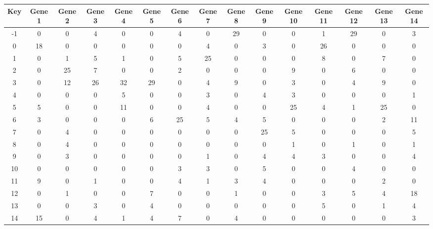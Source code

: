 \begin{tabular}{|c|c|c|c|c|c|c|c|c|c|c|c|c|c|c|}
\hline
Key & Gene 1 & Gene 2 & Gene 3 & Gene 4 & Gene 5 & Gene 6 & Gene 7 & Gene 8 & Gene 9 & Gene 10 & Gene 11 & Gene 12 & Gene 13 & Gene 14 \\
\hline
-1 & 0 & 0 & 4 & 0 & 0 & 4 & 0 & 29 & 0 & 0 & 1 & 29 & 0 & 3 \\
0 & 18 & 0 & 0 & 0 & 0 & 0 & 4 & 0 & 3 & 0 & 26 & 0 & 0 & 0 \\
1 & 0 & 1 & 5 & 1 & 0 & 5 & 25 & 0 & 0 & 0 & 8 & 0 & 7 & 0 \\
2 & 0 & 25 & 7 & 0 & 0 & 2 & 0 & 0 & 0 & 9 & 0 & 6 & 0 & 0 \\
3 & 0 & 12 & 26 & 32 & 29 & 0 & 4 & 9 & 0 & 3 & 0 & 4 & 9 & 0 \\
4 & 0 & 0 & 0 & 5 & 0 & 0 & 3 & 0 & 4 & 3 & 0 & 0 & 0 & 1 \\
5 & 5 & 0 & 0 & 11 & 0 & 0 & 4 & 0 & 0 & 25 & 4 & 1 & 25 & 0 \\
6 & 3 & 0 & 0 & 0 & 6 & 25 & 5 & 4 & 5 & 0 & 0 & 0 & 2 & 11 \\
7 & 0 & 4 & 0 & 0 & 0 & 0 & 0 & 0 & 25 & 5 & 0 & 0 & 0 & 5 \\
8 & 0 & 4 & 0 & 0 & 0 & 0 & 0 & 0 & 0 & 1 & 0 & 1 & 0 & 1 \\
9 & 0 & 3 & 0 & 0 & 0 & 0 & 1 & 0 & 4 & 4 & 3 & 0 & 0 & 4 \\
10 & 0 & 0 & 0 & 0 & 0 & 3 & 3 & 0 & 5 & 0 & 0 & 4 & 0 & 0 \\
11 & 9 & 0 & 1 & 0 & 0 & 4 & 1 & 3 & 4 & 0 & 0 & 0 & 2 & 0 \\
12 & 0 & 1 & 0 & 0 & 7 & 0 & 0 & 1 & 0 & 0 & 3 & 5 & 4 & 18 \\
13 & 0 & 0 & 3 & 0 & 4 & 0 & 0 & 0 & 0 & 0 & 5 & 0 & 1 & 4 \\
14 & 15 & 0 & 4 & 1 & 4 & 7 & 0 & 4 & 0 & 0 & 0 & 0 & 0 & 3 \\
\hline
\end{tabular}